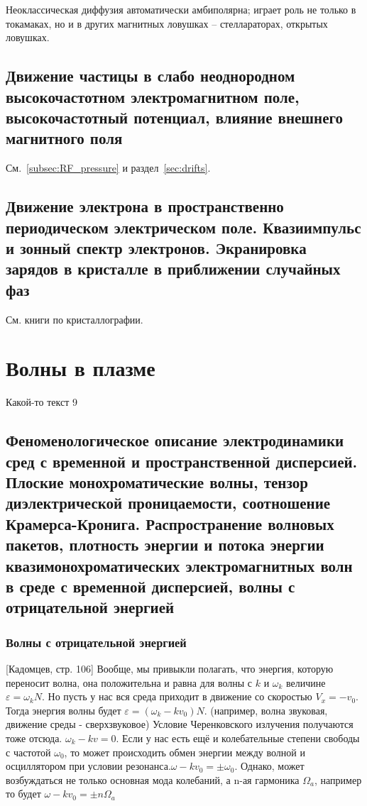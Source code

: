 \documentclass[10pt, a4paper]{article}
\let\stdsection\section
\renewcommand\section{\newpage\stdsection}
\begin{document}
Неоклассическая диффузия автоматически амбиполярна; играет роль не только в токамаках, но и в других магнитных ловушках -- стеллараторах, открытых ловушках.

\subsection{Движение частицы в слабо неоднородном высокочастотном электромагнитном поле, высокочастотный потенциал, влияние внешнего магнитного поля}

См.~\ref{subsec:RF_pressure} и раздел~\ref{sec:drifts}.

\subsection{Движение электрона в пространственно периодическом электрическом поле. Квазиимпульс и зонный спектр электронов. Экранировка зарядов в кристалле в приближении случайных фаз}

См. книги по кристаллографии.

\section{Волны в плазме}

Какой-то текст 9

\subsection{Феноменологическое описание электродинамики сред с временной и пространственной дисперсией. Плоские монохроматические волны, тензор диэлектрической проницаемости, 	соотношение Крамерса-Кронига. Распространение волновых пакетов, плотность энергии и потока энергии квазимонохроматических электромагнитных волн в среде с временной дисперсией, волны с отрицательной энергией}
\subsubsection{Волны с отрицательной энергией}

[Кадомцев, стр. 106]
Вообще, мы привыкли полагать, что энергия, которую переносит волна, она положительна и равна для волны с $k$ и $\omega_k $ величине $\varepsilon= \omega_k N$.
Но пусть у нас вся среда приходит в движение со скоростью $V_x=-v_0$. Тогда энергия волны будет $\varepsilon= (\omega_k-kv_0) N$. (например, волна звуковая, движение среды - сверхзвуковое)
Условие Черенковского излучения получаются тоже отсюда. $\omega_k -kv=0$.
Если у нас есть ещё и колебательные степени свободы с частотой $\omega_0$, то может происходить обмен энергии между волной и осциллятором при условии резонанса.$\omega-kv_0=\pm \omega_0$.
Однако, может возбуждаться не только основная мода колебаний, а n-ая гармоника $\Omega_a$, например
то будет $\omega-kv_0=\pm n \Omega_a$
\end{document}
